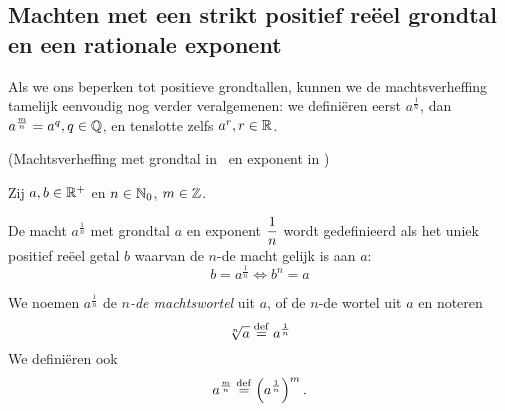 \documentclass{ximera}
\begin{document}
\subsection{Machten met een strikt positief re\"eel grondtal en een rationale exponent}

Als we ons beperken tot positieve grondtallen, kunnen we de machtsverheffing tamelijk eenvoudig nog verder veralgemenen: we definiëren eerst $a^{\frac1n}$, dan $a^{\frac mn} = a^q, q\in\mathbb{Q}$, en tenslotte zelfs $a^r, r\in\mathbb{R}$.
 

\begin{definition}(Machtsverheffing met grondtal in \Rplus\ en exponent in \Q)
	
	Zij $a,b\in\mathbb{R}^+$ en $n\in\mathbb{N}_0$, $m\in\mathbb{Z}$. 
	
	De macht $a^{\frac{1}{n}}$ met grondtal $a$ en exponent $\displaystyle\frac{1}{n}$ wordt
	gedefinieerd als het uniek positief re\"eel getal $b$ waarvan de $n$-de
	macht gelijk is aan $a$:
	\[b = a^\frac 1n \iff b^n = a\]

	
	We noemen $a^{\frac{1}{n}}$ de \textit{$n$-de machtswortel }uit $a$, of de $n$-de wortel uit $a$ en noteren
	\[
		\sqrt[n]{a} \overset{\mathrm{def}}{=} a^\frac 1n
	\]
	We definiëren ook
	\[a^{\frac{m}{n}}\overset{\mathrm{def}}{=} \left(a^{\frac{1}{n}}\right)^m.\]
\end{definition}
\end{document}

